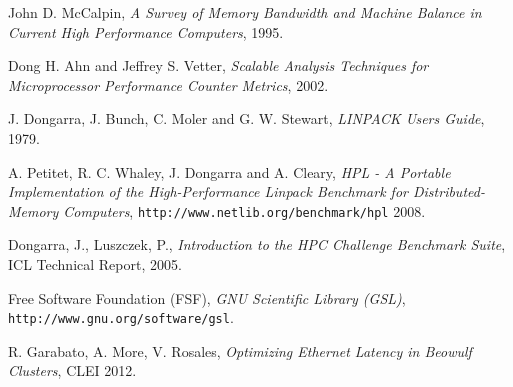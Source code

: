 \documentclass[a4paper]{report}
\begin{document}
\begin{thebibliography}{9}
  John D. McCalpin,
  \emph{A Survey of Memory Bandwidth and Machine Balance in Current High
    Performance Computers},
  1995.
  
  Dong H. Ahn and Jeffrey S. Vetter,
  \emph{Scalable Analysis Techniques for Microprocessor Performance Counter
    Metrics},
  2002.
  
  J. Dongarra, J. Bunch, C. Moler and G. W. Stewart, 
  \emph{LINPACK Users Guide},
  1979.
  
  A. Petitet, R. C. Whaley, J. Dongarra and A. Cleary, 
  \emph{HPL - A Portable Implementation of the High-Performance Linpack
    Benchmark for Distributed-Memory Computers}, {\tt http://www.netlib.org/benchmark/hpl}
  2008.

  Dongarra, J., Luszczek, P.,
  \emph{Introduction to the HPC Challenge Benchmark Suite}, ICL Technical Report,
  2005.  
  
  Free Software Foundation (FSF), \emph{GNU Scientific Library (GSL)},
  {\tt http://www.gnu.org/software/gsl}.

	R. Garabato, A. More, V. Rosales,
	\emph{Optimizing Ethernet Latency in Beowulf Clusters},
	CLEI 2012.

\end{thebibliography}
\end{document}
